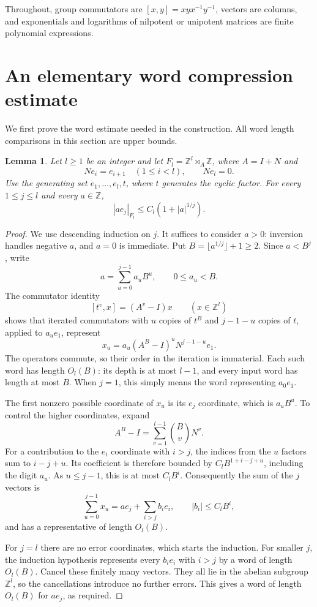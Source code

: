 \documentclass[11pt]{article}
\numberwithin{equation}{section}
\newtheorem{lemma}[theorem]{Lemma}
\theoremstyle{remark}
\newcommand{\Z}{\mathbb Z}
\begin{document}
Throughout, group commutators are $[x,y]=xyx^{-1}y^{-1}$, vectors are
columns, and exponentials and logarithms of nilpotent or unipotent
matrices are finite polynomial expressions.

\section{An elementary word compression estimate}\label{sec:compression}

We first prove the word estimate needed in the construction. All word
length comparisons in this section are upper bounds.

\begin{lemma}\label{lem:blockcompression}
Let $l\ge1$ be an integer and let $F_l=\Z^l\rtimes_A\Z$, where $A=I+N$ and
\[
 Ne_i=e_{i+1}\quad(1\le i<l),\qquad Ne_l=0.
\]
Use the generating set $e_1,\ldots,e_l,t$, where $t$ generates the cyclic
factor. For every $1\le j\le l$ and every $a\in\Z$,
\[
 |ae_j|_{F_l}\le C_l(1+|a|^{1/j}).
\]
\end{lemma}

\begin{proof}
We use descending induction on $j$. It suffices to consider $a>0$:
inversion handles negative $a$, and $a=0$ is immediate. Put
$B=\lfloor a^{1/j}\rfloor+1\ge2$. Since $a<B^j$, write
\[
 a=\sum_{u=0}^{j-1}a_u B^u,\qquad 0\le a_u<B.
\]
The commutator identity
\[
 [t^v,x]=(A^v-I)x\qquad(x\in\Z^l)
\]
shows that iterated commutators with $u$ copies of $t^B$ and
$j-1-u$ copies of $t$, applied to $a_ue_1$, represent
\[
 x_u=a_u(A^B-I)^uN^{j-1-u}e_1.
\]
The operators commute, so their order in the iteration is immaterial.
Each such word has length $O_l(B)$: its depth is at most $l-1$, and
every input word has length at most $B$. When $j=1$, this simply means
the word representing $a_0e_1$.

The first nonzero possible coordinate of $x_u$ is its $e_j$ coordinate,
which is $a_u B^u$. To control the higher coordinates, expand
\[
 A^B-I=\sum_{v=1}^{l-1}\binom Bv N^v.
\]
For a contribution to the $e_i$ coordinate with $i>j$, the indices from
the $u$ factors sum to $i-j+u$. Its coefficient is therefore bounded by
$C_lB^{1+i-j+u}$, including the digit $a_u$. As $u\le j-1$, this is
at most $C_lB^i$. Consequently the sum of the $j$ vectors is
\[
 \sum_{u=0}^{j-1}x_u=ae_j+\sum_{i>j}b_i e_i,
 \qquad |b_i|\le C_lB^i,
\]
and has a representative of length $O_l(B)$.

For $j=l$ there are no error coordinates, which starts the induction.
For smaller $j$, the induction hypothesis represents every $b_i e_i$
with $i>j$ by a word of length $O_l(B)$. Cancel these finitely many
vectors. They all lie in the abelian subgroup $\Z^l$, so the
cancellations introduce no further errors. This gives a word of length
$O_l(B)$ for $ae_j$, as required.
\end{proof}
\end{document}

